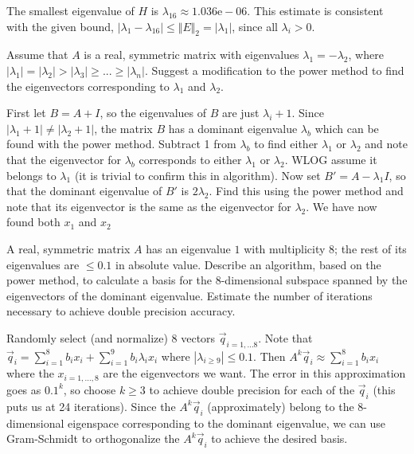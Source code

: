 \documentclass[10pt,a4paper]{article}
\newenvironment{problem}[2][Problem]{\begin{trivlist}
\item[\hskip \labelsep {\bfseries #1}\hskip \labelsep {\bfseries #2.}]}{\end{trivlist}}
\begin{document}
The smallest eigenvalue of $H$ is $\lambda_{16} \approx 1.036\text{e}-06$.  This estimate is consistent with the given bound, $| \lambda_1- \lambda_{16}| \leq \Vert E \Vert_2 = |\lambda_1|$, since all $\lambda_i >0$.


\begin{problem}{1d}
Assume that $A$ is a real, symmetric matrix with eigenvalues $\lambda_1 = - \lambda_2$, where $| \lambda_1 | = |\lambda_2| > |\lambda_3| \geq ... \geq |\lambda_n|$.  Suggest a modification to the power method to find the eigenvectors corresponding to $\lambda_1$ and $\lambda_2$.
\end{problem}
First let $B = A + I$, so the eigenvalues of $B$ are just $\lambda_i + 1$.  Since $|\lambda_1+1| \neq |\lambda_2 +1|$, the matrix $B$ has a dominant eigenvalue $\lambda_b$ which can be found with the power method.  Subtract 1 from $\lambda_b$ to find either $\lambda_1$ or $\lambda_2$ and note that the eigenvector for $\lambda_b$ corresponds to either $\lambda_1$ or $\lambda_2$.  WLOG assume it belongs to $\lambda_1$ (it is trivial to confirm this in algorithm).  Now set $B' = A - \lambda_1 I$, so that the dominant eigenvalue of $B'$ is $2 \lambda_2$.  Find this using the power method and note that its eigenvector is the same as the eigenvector for $\lambda_2$.  We have now found both $x_1$ and $x_2$

\begin{problem}{1e}
A real, symmetric matrix $A$ has an eigenvalue $1$ with multiplicity $8$; the rest of its eigenvalues are $\leq 0.1$ in absolute value.  Describe an algorithm, based on the power method, to calculate a basis for the 8-dimensional subspace spanned by the eigenvectors of the dominant eigenvalue.  Estimate the number of iterations necessary to achieve double precision accuracy.
\end{problem}
Randomly select (and normalize) 8 vectors $\vec{q}_{i=1,...8}$.  Note that $\vec{q}_i = \sum\limits_{i=1}^8 b_i x_i +  \sum\limits_{i=1}^9 b_i \lambda_i x_i$ where $|\lambda_{i\geq9}| \leq 0.1$.  Then $A^k \vec{q}_i \approx \sum\limits_{i=1}^8 b_i x_i$ where the $x_{i=1,...,8}$ are the eigenvectors we want.  The error in this approximation goes as $0.1^k$, so choose $k \geq 3$ to achieve double precision for each of the $\vec{q}_i$ (this puts us at 24 iterations).  Since the $A^k \vec{q}_i$ (approximately) belong to the 8-dimensional eigenspace corresponding to the dominant eigenvalue, we can use Gram-Schmidt to orthogonalize the $A^k \vec{q}_i$ to achieve the desired basis.  
\end{document}
